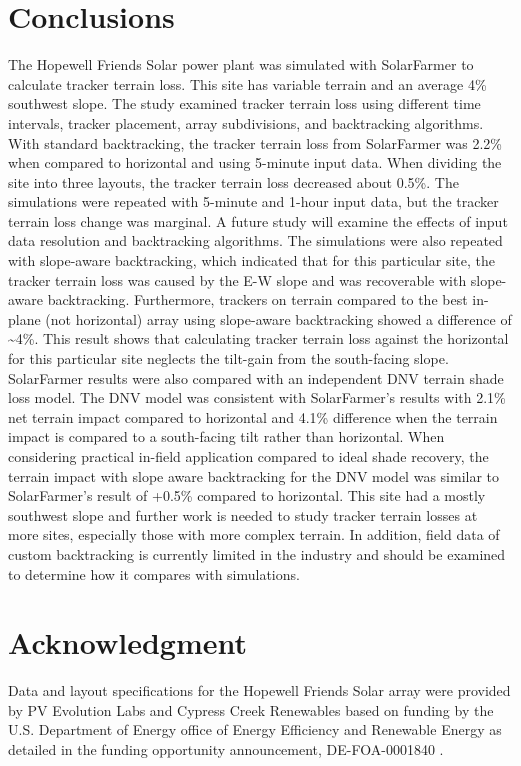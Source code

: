 \documentclass[conference]{IEEEtran}
\begin{document}
\section{Conclusions}
The Hopewell Friends Solar power plant was simulated with SolarFarmer to calculate tracker terrain loss. This site has variable terrain and an average 4\% southwest slope. The study examined tracker terrain loss using different time intervals, tracker placement, array subdivisions, and backtracking algorithms. With standard backtracking, the tracker terrain loss from SolarFarmer was 2.2\% when compared to horizontal and using 5-minute input data. When dividing the site into three layouts, the tracker terrain loss decreased about 0.5\%. The simulations were repeated with 5-minute and 1-hour input data, but the tracker terrain loss change was marginal. A future study will examine the effects of input data resolution and backtracking algorithms. The simulations were also repeated with slope-aware backtracking, which indicated that for this particular site, the tracker terrain loss was caused by the E-W slope and was recoverable with slope-aware backtracking. Furthermore, trackers on terrain compared to the best in-plane (not horizontal) array using slope-aware backtracking showed a difference of \textasciitilde4\%. This result shows that calculating tracker terrain loss against the horizontal for this particular site neglects the tilt-gain from the south-facing slope. SolarFarmer results were also compared with an independent DNV terrain shade loss model. The DNV model was consistent with SolarFarmer's results with 2.1\% net terrain impact compared to horizontal and 4.1\% difference when the terrain impact is compared to a south-facing tilt rather than horizontal. When considering practical in-field application compared to ideal shade recovery, the terrain impact with slope aware backtracking for the DNV model was similar to SolarFarmer's result of +0.5\% compared to horizontal. This site had a mostly southwest slope and further work is needed to study tracker terrain losses at more sites, especially those with more complex terrain. In addition, field data of custom backtracking is currently limited in the industry and should be examined to determine how it compares with simulations.

\section*{Acknowledgment}

Data and layout specifications for the Hopewell Friends Solar array were provided by PV Evolution Labs and Cypress Creek Renewables based on funding by the U.S. Department of Energy office of Energy Efficiency and Renewable Energy as detailed in the funding opportunity announcement, DE-FOA-0001840 \cite{CypressCreekRenewables2019}.



\end{document}
